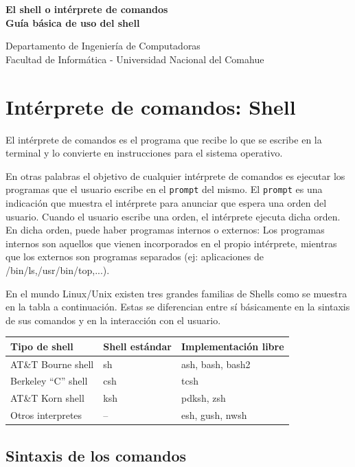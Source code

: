\documentclass[12pt]{article}
\def\maketitle{

 \makeatletter
 {\color{bl} \centering \huge \sc \textbf{
 El shell o intérprete de comandos \\ 
\large \vspace*{-8pt} \color{black} Guía básica de uso del shell
 \vspace*{8pt} }\par}
 \makeatother


 \makeatletter
 {\centering \small 
 	Departamento de Ingeniería de Computadoras \\
 	Facultad de Informática - Universidad Nacional del Comahue \\
 	\vspace{20pt} }
 \makeatother

}
\begin{document}
\thispagestyle{empty}
\maketitle
\setlength{\parindent}{0pt}

\section{Intérprete de comandos: Shell}

El intérprete de comandos es el programa que recibe lo que se escribe en la terminal y lo convierte en instrucciones para el sistema operativo.

En otras palabras el objetivo de cualquier intérprete de comandos es ejecutar los programas que el usuario escribe en el \texttt{prompt} del mismo. 
El \texttt{prompt} es una indicación que muestra el intérprete para anunciar que espera una orden del usuario. Cuando el usuario escribe una orden, 
el intérprete ejecuta dicha orden. En dicha orden, puede haber programas internos o externos: Los programas internos son aquellos que vienen 
incorporados en el propio intérprete, mientras que los externos son programas separados (ej: aplicaciones de /bin/ls,/usr/bin/top,...).\cite{curlin}

En el mundo Linux/Unix existen tres grandes familias de Shells como se muestra en la tabla a continuación. Estas se diferencian entre 
sí básicamente en la sintaxis de sus comandos y en la interacción con el usuario.

\begin{center}
\begin{tabular}{|l|l|l|}\hline
\rowcolor{tcA}
\textbf{Tipo de shell} & \textbf{Shell estándar} & \textbf{Implementación libre}\\\hline
AT\&T Bourne shell & sh & ash, bash, bash2\\\hline
Berkeley ``C'' shell & csh & tcsh\\\hline
AT\&T Korn shell & ksh & pdksh, zsh\\\hline
Otros interpretes  & -- & esh, gush, nwsh\\\hline
\end{tabular}
\end{center}

\subsection{Sintaxis de los comandos}
\end{document}
